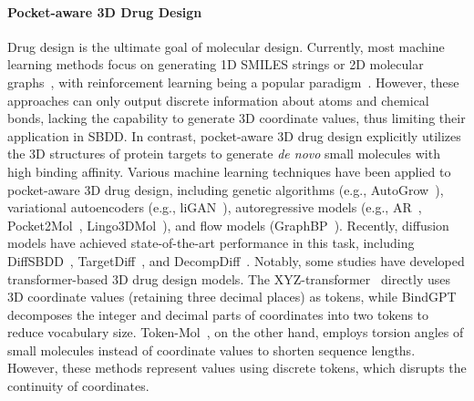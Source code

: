 \paragraph{Pocket-aware 3D Drug Design}
Drug design is the ultimate goal of molecular design. Currently, most machine learning methods focus on generating 1D SMILES strings or 2D molecular graphs~\citep{SMILES-LSTM,LIMO,GEAM}, with reinforcement learning being a popular paradigm~\citep{Reinvent,GCPN,GEGL,RationaleRL,MolGym,FREED}. However, these approaches can only output discrete information about atoms and chemical bonds, lacking the capability to generate 3D coordinate values, thus limiting their application in SBDD. In contrast, pocket-aware 3D drug design explicitly utilizes the 3D structures of protein targets to generate \textit{de novo} small molecules with high binding affinity. Various machine learning techniques have been applied to pocket-aware 3D drug design, including genetic algorithms (e.g., AutoGrow~\citep{AutoGrow4}), variational autoencoders (e.g., liGAN~\citep{liGAN}), autoregressive models (e.g., AR~\citep{AR}, Pocket2Mol~\citep{Pocket2Mol}, Lingo3DMol~\citep{Lingo3DMol}), and flow models (GraphBP~\citep{GraphBP}). Recently, diffusion models have achieved state-of-the-art performance in this task, including DiffSBDD~\citep{DiffSBDD}, TargetDiff~\citep{TargetDiff}, and DecompDiff~\citep{DecompDiff}. Notably, some studies have developed transformer-based 3D drug design models. The XYZ-transformer~\citep{XYZtransformer} directly uses 3D coordinate values (retaining three decimal places) as tokens, while BindGPT~\citep{BindGPT} decomposes the integer and decimal parts of coordinates into two tokens to reduce vocabulary size. Token-Mol~\citep{Token-Mol}, on the other hand, employs torsion angles of small molecules instead of coordinate values to shorten sequence lengths. However, these methods represent values using discrete tokens, which disrupts the continuity of coordinates.